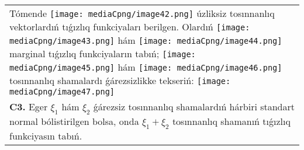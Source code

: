 \documentclass{article}
\begin{document}
\begin{tabular}{m{17cm}}
Tómende \texttt{[image: mediaCpng/image42.png]} úzliksiz tosınnanlıq vektorlardıń tıǵızlıq funkciyaları berilgen. Olardıń \texttt{[image: mediaCpng/image43.png]} hám \texttt{[image: mediaCpng/image44.png]} marginal tıǵızlıq funkciyaların tabıń; \texttt{[image: mediaCpng/image45.png]} hám \texttt{[image: mediaCpng/image46.png]} tosınnanlıq shamalardı ǵárezsizlikke tekseriń: \texttt{[image: mediaCpng/image47.png]}
 \\
\textbf{C3.} Eger \(\xi_{1}\) hám \(\xi_{2}\) ǵárezsiz tosınnanlıq shamalardıń hárbiri standart normal bólistirilgen bolsa, onda \(\xi_{1} + \xi_{2}\) tosınnanlıq shamanıń tıǵızlıq funkciyasın tabıń.
 \\

\end{tabular}
\vspace{1cm}
\end{document}
